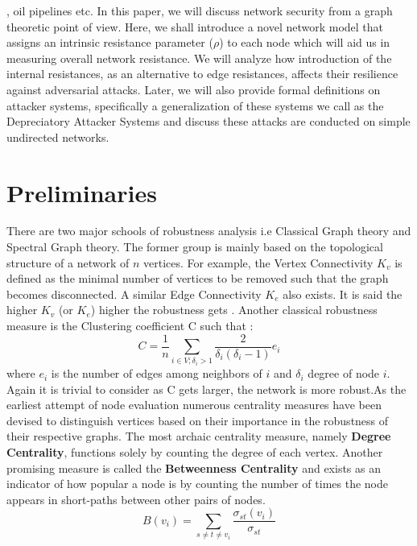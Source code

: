 \documentclass{article}
\begin{document}
\cite{guze4805898continuous}, oil pipelines\cite{Pipeline} etc. In this paper, we will discuss network security from a graph theoretic point of view. Here, we shall introduce a novel network model that assigns an intrinsic resistance parameter ($\rho$) to each node which will aid us in measuring overall network resistance. We will analyze how introduction of the internal resistances, as an alternative to edge resistances, affects their resilience against adversarial attacks. Later, we will also provide formal definitions on attacker systems, specifically a generalization of these systems we call as the Depreciatory Attacker Systems and discuss these attacks are conducted on simple undirected networks.
	
	
	\section{Preliminaries}
	There are two major schools of robustness analysis i.e Classical Graph theory and Spectral Graph theory. The former group is mainly based on the topological structure of a network of $n$ vertices. For example, the Vertex Connectivity $K_v$ is defined as the minimal number of vertices to be removed such that the graph becomes disconnected. A similar Edge Connectivity $K_e$ also exists. It is said the higher $K_v$ (or $K_e$) higher the robustness gets \cite{ellens2013graph}. Another classical robustness measure is the Clustering coefficient C such that \cite{watts1998collective}:
	\begin{equation*}
		C = \frac{1}{n} \sum_{i\in V;\delta_i>1}\frac{2}{\delta_i(\delta_i -1)}e_i
	\end{equation*}
	where $e_i$ is the number of edges among neighbors of $i$ and $\delta_i$ degree of node $i$. Again it is trivial to consider as C gets larger, the network is more robust.\newline As the earliest attempt of node evaluation numerous centrality measures have been devised to distinguish vertices based on their importance in the robustness of their respective graphs. The most archaic centrality measure, namely \textbf{Degree Centrality}, functions solely by counting the degree of each vertex. Another promising measure is called the \textbf{Betweenness Centrality} and exists as an indicator of how popular a node is by counting the number of times the node appears in short-paths between other pairs of nodes.\cite{lee2021betweenness}\cite{chen2013node}
	\begin{equation*}
		B(v_i) = \sum_{s\neq t\neq v_i}\frac{\sigma_{st}(v_i)}{\sigma_{st}}
	\end{equation*}
\end{document}
